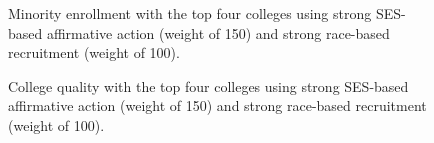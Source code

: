 \begin{figure}
  \centering
  \hfill%
  \caption{Minority enrollment with the top four colleges using strong SES-based affirmative action (weight of 150) and strong race-based recruitment (weight of 100).}
  \label{fig:c4}
\end{figure}

\begin{figure}
  \centering
  \hfill%
  \caption{College quality with the top four colleges using strong SES-based affirmative action (weight of 150) and strong race-based recruitment (weight of 100).}
  \label{fig:c5}
\end{figure}

